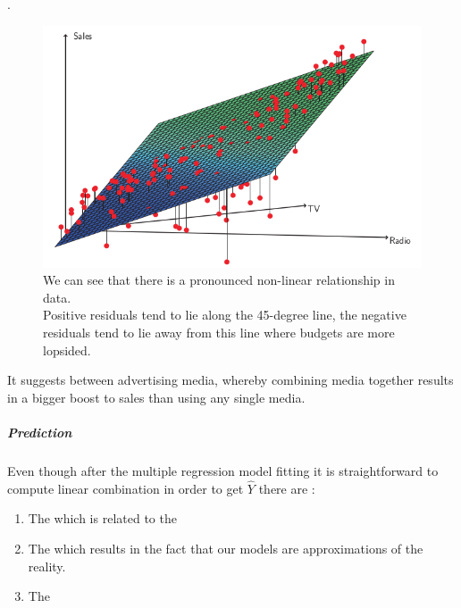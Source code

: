 .
\begin{figure}[H]
	\begin{center}
		\includegraphics[width=\textwidth]{./chap/1chap/2sec/2images/2_6dataPlot.png}
	\end{center}
	\caption{We can see that there is a pronounced non-linear
	relationship in data.\\Positive residuals  tend to lie along
	the 45-degree line, the negative residuals tend to lie away 
	from this line where budgets are more lopsided.}
	\label{fig:fig 2.6}
\end{figure}
It suggests  between advertising media, whereby combining
media together results in a bigger boost to sales than using any single
media.
\subparagraph{Prediction}
Even though after the multiple regression model fitting it is
straightforward to compute linear combination in order to get 
$\widehat{Y}$ there are :
\begin{enumerate}
	\item The 
		which is related to the 
	\item The  which results in the fact that our
		models are approximations of the reality.
	\item The 
\end{enumerate}
